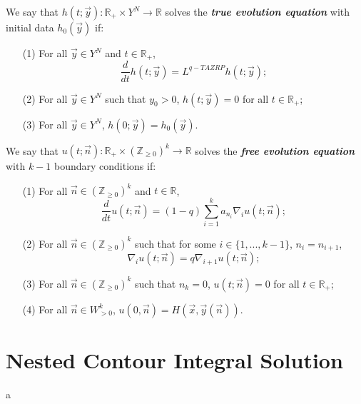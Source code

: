 \begin{definition}
We say that $h(t;\vec{y}): \mathbb{R}_+ \times Y^N \rightarrow \mathbb{R}$ solves the \textbf{\emph{true evolution equation}} with initial data $h_0(\vec{y})$ if:
\begin{enumerate}
\item[(1)] For all $\vec{y} \in Y^N$ and $t \in \mathbb{R}_+$, $$\frac{d}{dt} h(t;\vec{y}) = L^{q-TAZRP} h(t;\vec{y});$$
\item[(2)] For all $\vec{y} \in Y^N$ such that $y_0 > 0$, $h(t;\vec{y}) = 0$ for all $t \in \mathbb{R}_+$;
\item[(3)] For all $\vec{y} \in Y^N$, $h(0;\vec{y}) = h_0(\vec{y})$.
\end{enumerate}
\end{definition}

\begin{definition}
We say that $u(t;\vec{n}):\mathbb{R}_+ \times (\mathbb{Z}_{\ge 0})^k \rightarrow \mathbb{R}$ solves the \textbf{\emph{free evolution equation}} with $k-1$ boundary conditions if:
\begin{enumerate}
\item[(1)] For all $\vec{n} \in (\mathbb{Z}_{\ge 0})^k$ and $t \in \mathbb{R}$, $$\frac{d}{dt} u(t;\vec{n}) = (1-q) \sum_{i=1}^{k} a_{n_i} \nabla_i u(t;\vec{n});$$
\item[(2)] For all $\vec{n} \in (\mathbb{Z}_{\ge 0})^k$ such that for some $i \in \{1,...,k-1\}$, $n_i = n_{i+1}$, $$\nabla_i u(t;\vec{n}) = q \nabla_{i+1} u(t;\vec{n});$$
\item[(3)] For all $\vec{n} \in (\mathbb{Z}_{\ge 0})^k$ such that $n_k = 0$, $u(t;\vec{n}) = 0$ for all $t \in \mathbb{R}_+$;
\item[(4)] For all $\vec{n} \in W^k_{>0}$, $u(0,\vec{n}) = H(\vec{x},\vec{y}(\vec{n}))$.
\end{enumerate}
\end{definition}
\section{Nested Contour Integral Solution}
a